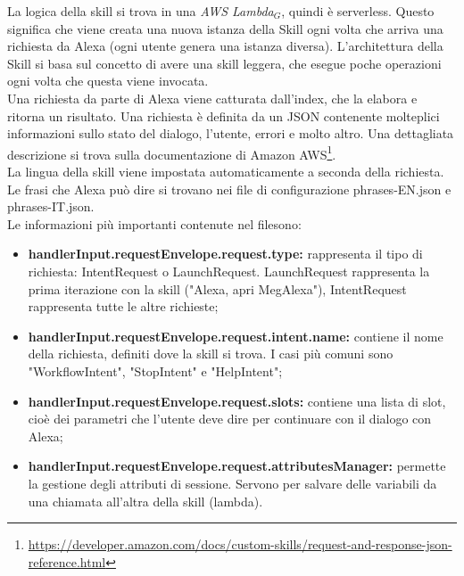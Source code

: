 La logica della skill si trova in una \textit{AWS Lambda$_{G}$}, quindi è serverless. Questo significa che viene creata una nuova istanza della Skill ogni volta che arriva una richiesta da Alexa (ogni utente genera una istanza diversa). L'architettura della Skill si basa sul concetto di avere una skill leggera, che esegue poche operazioni ogni volta che questa viene invocata.\\
Una richiesta da parte di Alexa viene catturata dall'index, che la elabora e ritorna un risultato. Una richiesta è definita da un JSON contenente molteplici informazioni sullo stato del dialogo, l'utente, errori e molto altro. Una dettagliata descrizione si trova sulla documentazione di Amazon AWS\footnote{\url{https://developer.amazon.com/docs/custom-skills/request-and-response-json-reference.html}}.\\
La lingua della skill viene impostata automaticamente a seconda della richiesta. Le frasi che Alexa può dire si trovano nei file di configurazione phrases-EN.json e phrases-IT.json.\\
Le informazioni più importanti contenute nel filesono:\label{paramsSkill}
\begin{itemize}
    \item \textbf{handlerInput.requestEnvelope.request.type:} rappresenta il tipo di richiesta: IntentRequest o LaunchRequest. LaunchRequest rappresenta la prima iterazione con la skill ("Alexa, apri MegAlexa"), IntentRequest rappresenta tutte le altre richieste;
    \item \textbf{handlerInput.requestEnvelope.request.intent.name:} contiene il nome della richiesta, definiti dove la skill si trova. I casi più comuni sono "WorkflowIntent", "StopIntent" e "HelpIntent";
    \item \textbf{handlerInput.requestEnvelope.request.slots:} contiene una lista di slot, cioè dei parametri che l'utente deve dire per continuare con il dialogo con Alexa;
    \item \textbf{handlerInput.requestEnvelope.request.attributesManager:} permette la gestione degli attributi di sessione. Servono per salvare delle variabili da una chiamata all'altra della skill (lambda).
\end{itemize}


